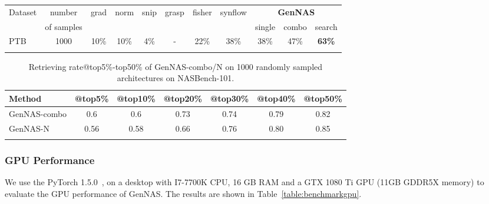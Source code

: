 \documentclass{article}
\begin{document}
\begin{table}[!h]
\begin{tabular}{lcccccccccc}
\Xhline{0.8pt}
\multicolumn{11}{l}{\textbf{NASBench-NLP}} \\ \hline
Dataset & number& grad& norm&	snip&	grasp&	fisher&	synflow&\multicolumn{3}{c}{\textbf{GenNAS}} \\ \cline{9-11}
 &of samples&&&&&&& single & combo & search \\\hline
PTB &1000& 10\%&	10\%&	4\%&	-&	22\%&	38\%&	38\%&	47\%&	\textbf{63\%}\\\Xhline{0.8pt}

\end{tabular}
\end{table}

\begin{table}[t]
\vspace{-8pt}
\scriptsize
  \caption{Retrieving rate@top5\%-top50\% of GenNAS-combo/N on 1000 randomly sampled architectures on NASBench-101.}
  \label{table:GenNAS_nasbench_top50}
  \centering
\setlength{\tabcolsep}{3pt}

\begin{tabular}{lcccccc}
\Xhline{0.8pt}
Method& @top5\%&	@top10\%& @top20\% & @top30\% & @top40\% & @top50\%
 \\\hline
GenNAS-combo & 0.6&	0.6&	0.73&	0.74&	0.79&	0.82\\
GenNAS-N & 0.56&	0.58&	0.66&	0.76&	0.80&	0.85 \\
\Xhline{0.8pt}
\vspace{-8pt}
\end{tabular}
\end{table}



\subsubsection{GPU Performance}

We use the PyTorch 1.5.0~\cite{NEURIPS2019_9015}, on a desktop with I7-7700K CPU, 16 GB RAM and a GTX 1080 Ti GPU (11GB GDDR5X memory) to evaluate the GPU performance of GenNAS. The results are shown in Table~\ref{table:benchmarkgpu}.
\end{document}
